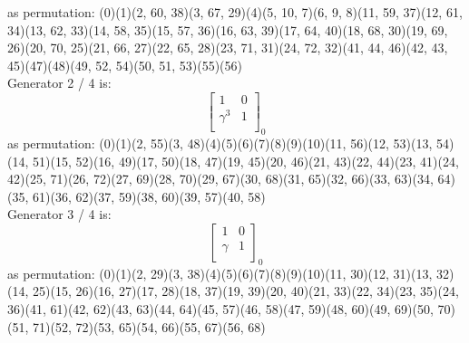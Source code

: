 as permutation:
(0)(1)(2, 60, 38)(3, 67, 29)(4)(5, 10, 7)(6, 9, 8)(11, 59, 37)(12, 61, 34)(13, 62, 33)(14, 58, 35)(15, 57, 36)(16, 63, 39)(17, 64, 40)(18, 68, 30)(19, 69, 26)(20, 70, 25)(21, 66, 27)(22, 65, 28)(23, 71, 31)(24, 72, 32)(41, 44, 46)(42, 43, 45)(47)(48)(49, 52, 54)(50, 51, 53)(55)(56)\\
Generator 2 / 4 is:
$$
\left[
\begin{array}{*{2}{r}}
1 & 0\\
\gamma^{3} & 1\\
\end{array}
\right]
_{0}
$$
as permutation:
(0)(1)(2, 55)(3, 48)(4)(5)(6)(7)(8)(9)(10)(11, 56)(12, 53)(13, 54)(14, 51)(15, 52)(16, 49)(17, 50)(18, 47)(19, 45)(20, 46)(21, 43)(22, 44)(23, 41)(24, 42)(25, 71)(26, 72)(27, 69)(28, 70)(29, 67)(30, 68)(31, 65)(32, 66)(33, 63)(34, 64)(35, 61)(36, 62)(37, 59)(38, 60)(39, 57)(40, 58)\\
Generator 3 / 4 is:
$$
\left[
\begin{array}{*{2}{r}}
1 & 0\\
\gamma  & 1\\
\end{array}
\right]
_{0}
$$
as permutation:
(0)(1)(2, 29)(3, 38)(4)(5)(6)(7)(8)(9)(10)(11, 30)(12, 31)(13, 32)(14, 25)(15, 26)(16, 27)(17, 28)(18, 37)(19, 39)(20, 40)(21, 33)(22, 34)(23, 35)(24, 36)(41, 61)(42, 62)(43, 63)(44, 64)(45, 57)(46, 58)(47, 59)(48, 60)(49, 69)(50, 70)(51, 71)(52, 72)(53, 65)(54, 66)(55, 67)(56, 68)\\
